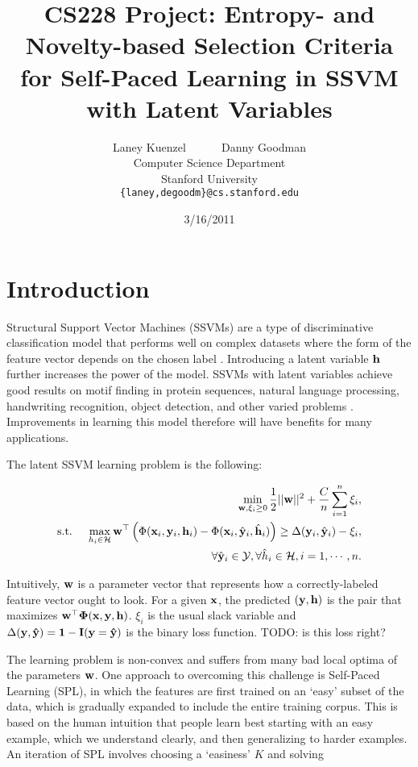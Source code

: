 \documentclass{article}
\title{CS228 Project: Entropy- and Novelty-based Selection Criteria for Self-Paced Learning in SSVM with Latent Variables}
\date{3/16/2011}
\author{
Laney Kuenzel ~~~~~ Danny Goodman\\
Computer Science Department \\
Stanford University \\
\texttt{\{laney,degoodm\}@cs.stanford.edu}
}
\newcommand{\mysection}[1]{\vspace{-4mm}\section{#1}\vspace{-4mm}}
\begin{document}
\maketitle
\vspace{-8mm}

\mysection{Introduction}
\label{sec:introduction}
Structural Support Vector Machines (SSVMs) are a type of discriminative classification model that performs well on complex datasets where the form of the feature vector depends on the chosen label \cite{SSVM}.  Introducing a latent variable $\bf h$ further increases the power of the model.  SSVMs with latent variables achieve good results on motif finding in protein sequences, natural language processing, handwriting recognition, object detection, and other varied problems \cite{SPL,App1}.  Improvements in learning this model therefore will have benefits for many applications.

The latent SSVM learning problem is the following\cite{SPL}:

\begin{eqnarray}
&&\min_{{\bf w},\xi_i \geq 0} \frac{1}{2}||{\bf w}||^2 + \frac{C}{n} \sum_{i=1}^n \xi_i, \nonumber \\
\mbox{s.t. } && \max_{h_i \in {\cal H}} {\bf w}^\top \left(\Phi({\bf x}_i,{\bf y}_i,{\bf h}_i) - 
		\Phi({\bf x}_i,\hat{\bf y}_i,\hat{\bf h}_i) \right)
	 \geq \Delta({\bf y}_i,\hat{\bf y}_i) - \xi_i, \nonumber \\
\label{eq:latentSSVM}
&&\forall \hat{\bf y}_i \in {\cal Y}, \forall \hat{h}_i \in {\cal H}, i=1,\cdots,n.
\end{eqnarray}

Intuitively, $\bf w$ is a parameter vector that represents how a correctly-labeled feature vector ought to look.  For a given $\bf x$, the predicted $(\bf y,\bf h)$ is the pair that maximizes $\bf{{w}} ^\top \Phi(\bf x,\bf y,\bf h)$.  $\xi_i$ is the usual slack variable 
and $\Delta(\bf y,\hat{\bf y})=1-I(\bf y=\hat{\bf y})$ is the binary loss function. TODO: is this loss right?

The learning problem is non-convex and suffers from many bad local optima of the parameters $\bf w$.  One approach to overcoming this challenge is Self-Paced Learning (SPL), in which the features are first trained on an `easy' subset of the data, which is gradually expanded to include the entire training corpus\cite{SPL}.  This is based on the human intuition that people learn best starting with an easy example, which we understand clearly, and then generalizing to harder examples.  An iteration of SPL involves choosing a `easiness' $K$ and solving
\end{document}
